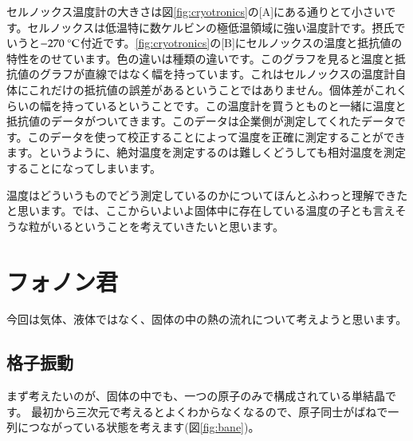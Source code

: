 \documentclass[10pt,b5paper,papersize,dvipdfmx]{jsbook}
\begin{document}
セルノックス温度計の大きさは図\ref{fig:cryotronics}の[A]にある通りとて小さいです。セルノックスは低温特に数ケルビンの極低温領域に強い温度計です。摂氏でいうと$-270\ ^\circ \rm{C}$付近です。\ref{fig:cryotronics}の[B]にセルノックスの温度と抵抗値の特性をのせています。色の違いは種類の違いです。このグラフを見ると温度と抵抗値のグラフが直線ではなく幅を持っています。これはセルノックスの温度計自体にこれだけの抵抗値の誤差があるということではありません。個体差がこれくらいの幅を持っているということです。この温度計を買うとものと一緒に温度と抵抗値のデータがついてきます。このデータは企業側が測定してくれたデータです。このデータを使って校正することによって温度を正確に測定することができます。というように、絶対温度を測定するのは難しくどうしても相対温度を測定することになってしまいます。\par
温度はどういうものでどう測定しているのかについてほんとふわっと理解できたと思います。では、ここからいよいよ固体中に存在している温度の子とも言えそうな粒がいるということを考えていきたいと思います。

\section{フォノン君}
今回は気体、液体ではなく、固体の中の熱の流れについて考えようと思います。
\subsection{格子振動}
まず考えたいのが、固体の中でも、一つの原子のみで構成されている単結晶です。
最初から三次元で考えるとよくわからなくなるので、原子同士がばねで一列につながっている状態を考えます(図\ref{fig:bane})。\par
\end{document}

